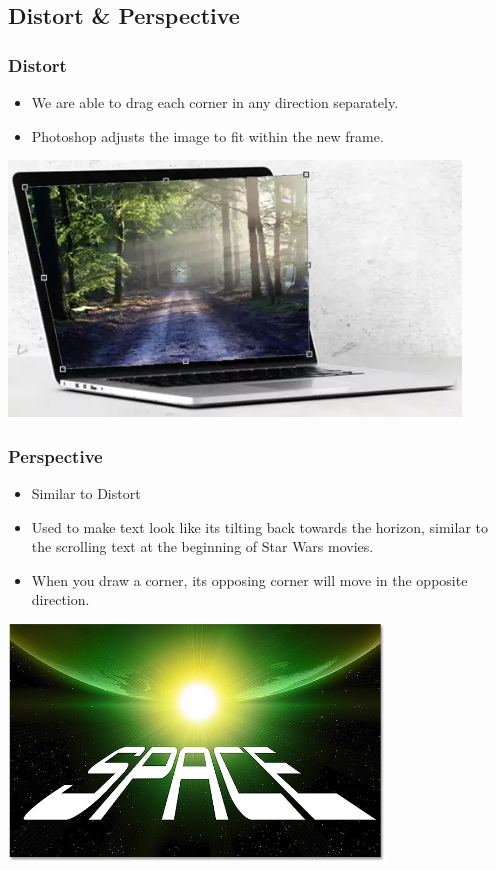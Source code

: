 \documentclass{beamer}
\begin{document}
		\subsection{Distort \& Perspective}
\begin{frame}
	\frametitle{Distort}
	\begin{itemize}
		\item We are able to drag each corner in any direction separately.  
		\item Photoshop adjusts the image to fit within the new frame.
	\end{itemize}
	\begin{center}
		\includegraphics[width = 0.9\textwidth]{images/distort.png}
	\end{center}
\end{frame}

\begin{frame}
	\frametitle{Perspective}
	\begin{itemize}
		\item Similar to Distort
		\item Used to make text look like its tilting back towards the horizon, similar to the scrolling text at the beginning of Star Wars movies.
		\item When you draw a corner, its opposing corner will move in the opposite direction.
	\end{itemize}
	\begin{center}
		\includegraphics[width = 0.75\textwidth]{images/perspective.jpg}
	\end{center}
\end{frame}
\end{document}
